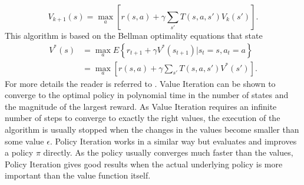 \documentclass[../main.tex]{subfiles}
\begin{document}
\begin{equation}
    V_{k+1}(s) = \max_a \left[ r(s,a) + \gamma  \sum_{s'} T(s,a,s')V_k(s') \right].
\end{equation}
This algorithm is based on the Bellman optimality equations that state
\begin{align}
	V^*(s) &= \max_a E\left\{r_{t+1}+\gamma V^*(s_{t+1}) | s_t = s, a_t = a\right\}\\
	&= \max_a \left[ r(s,a) + \gamma  \sum_{s'} T(s,a,s')V^*(s') \right].
\end{align}
For more details the reader is referred to \cite{sutton1998reinforcement}. Value Iteration can be shown to converge to the optimal policy in polynomial time in the number of states and the magnitude of the largest reward. As Value Iteration requires an infinite number of steps to converge to exactly the right values, the execution of the algorithm is usually stopped when the changes in the values become smaller than some value $\epsilon$.
Policy Iteration works in a similar way but evaluates and improves a policy $\pi$ directly. As the policy usually converges much faster than the values, Policy Iteration gives good results when the actual underlying policy is more important than the value function itself.
\end{document}
